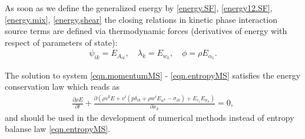 \documentclass[3p,times]{elsarticle}
\begin{document}
As soon as we define the generalized energy by \eqref{energy.SF}, \eqref{energy12.SF}, \eqref{energy.mix}, \eqref{energy,shear} the closing relations in kinetic phase interaction source terms are defined via thermodynamic forces (derivatives of energy with respect of parameters of state):
\begin{align}
\psi_{ik}=E_{A_{ik}}, \quad \lambda_{k}=E_{w_k}, \quad \phi=\rho E_{\alpha_1}.
\end{align} 

The solution to system \eqref{eqn.momentumMS} - \eqref{eqn.entropyMS} satisfies the energy conservation law which reads as
\begin{align} \label{eqn.energyMS}
\displaystyle\frac{\partial \rho E}{\partial t}+
\frac{\partial \left(\rho  v^k E +v^i(p \delta_{ik}+\rho w^i E_{w^k}-\sigma_{ik}) +E_{c_1}E_{w_k} \right)}{\partial x_k}=0,
\end{align}
and should be used in the development of numerical methods instead of entropy balanse law \eqref{eqn.entropyMS}. 
\end{document}
